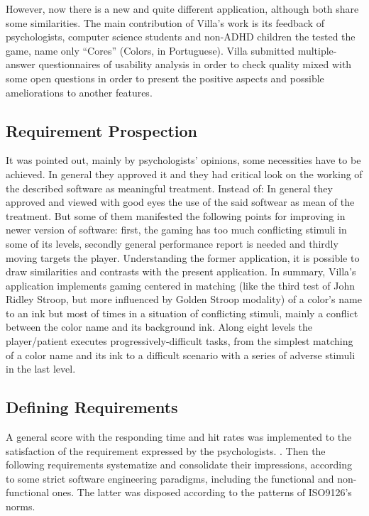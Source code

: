 However, now there is a new and quite different application, although both share some similarities. The main contribution of Villa's work is its feedback of psychologists, computer science students and non-ADHD children the tested the game, name only ``Cores'' (Colors, in Portuguese). Villa submitted multiple-answer questionnaires of usability analysis in order to check quality mixed with some open questions in order to present the positive aspects and possible ameliorations to another features. 

\subsection{Requirement Prospection}

It was pointed out, mainly by psychologists' opinions, some necessities have to be achieved. In general they approved it and they had critical look on the working of the described software as meaningful treatment. Instead of: In general they approved and viewed with good eyes the use of the said softwear as mean of the treatment. But some of them manifested the following points for improving in newer version of software: first, the gaming has too much conflicting stimuli in some of its levels, secondly general performance report is needed and thirdly moving targets the player. Understanding the former application, it is possible to draw similarities and contrasts with the present application. In summary, Villa's application implements gaming centered in matching  (like the third test of John Ridley Stroop, but more influenced by Golden Stroop modality) of a color's name to an ink but most of times in a situation of conflicting stimuli, mainly a conflict between the color name and its background ink. Along eight levels the player/patient executes progressively-difficult tasks, from the simplest matching of a color name and its ink to a difficult scenario with a series of adverse stimuli in the last level.

\subsection{Defining Requirements}

A general score with the responding time and hit rates was implemented to the satisfaction of the requirement expressed by the psychologists. \citep{Villa}. Then the following requirements systematize and consolidate their impressions, according to some strict software engineering paradigms, including the functional and non-functional ones. The latter was disposed according to the patterns of ISO9126's norms.


